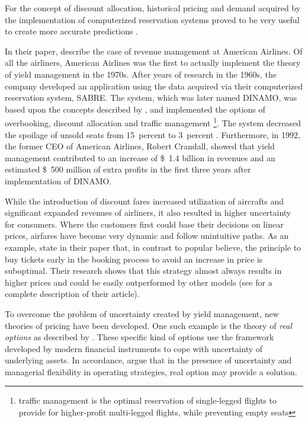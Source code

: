 For the concept of discount allocation, historical pricing and demand acquired by the implementation of computerized reservation systems proved to be very useful to create more accurate predictions \cite{littlewood1972forecasting}.

In their paper,  describe the case of revenue management at American Airlines. Of all the airliners, American Airlines was the first to actually implement the theory of yield management in the 1970s. After years of research in the 1960s, the company developed an application using the data acquired via their computerized reservation system, SABRE. The system, which was later named DINAMO, was based upon the concepts described by , and implemented the options of overbooking, discount allocation and traffic management \footnote{traffic management is the optimal reservation of single-legged flights to provide for higher-profit multi-legged flights, while preventing empty seats}. The system decreased the spoilage of unsold seats from 15~percent to 3~percent \cite{smith1992yield}. Furthermore, in 1992, the former CEO of American Airlines, Robert Crandall, showed that yield management contributed to an increase of \$~1.4 billion in revenues and an estimated \$~500 million of extra profits in the first three years after implementation of DINAMO.

While the introduction of discount fares increased utilization of aircrafts and significant expanded revenues of airliners, it also resulted in higher uncertainty for consumers. Where the customers first could base their decisions on linear prices, airfares have become very dynamic and follow unintuitive paths. As an example,  state in their paper that, in contrast to popular believe, the principle to buy tickets early in the booking process to avoid an increase in price is suboptimal. Their research shows that this strategy almost always results in higher prices and could be easily outperformed by other models (see \label{subsubsec:PredictabilityOfAirfares} for a complete description of their article).

To overcome the problem of uncertainty created by yield management, new theories of pricing have been developed. One such example is the theory of \emph{real options} as described by . These specific kind of options use the framework developed by modern financial instruments to cope with uncertainty of underlying assets. In accordance,  argue that in the presence of uncertainty and managerial flexibility in operating strategies, real option may provide a solution.

